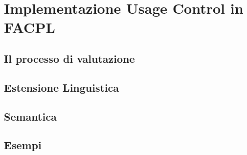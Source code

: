\chapter{Implementazione Usage Control in FACPL}
\label{chap:Implementazione Usage Control in FACPL}
\section{Il processo di valutazione}
\label{sec:Il processo di valutazione}
\section{Estensione Linguistica}
\label{sec:Estensione Linguistica}
\section{Semantica}
\label{sec:Semantica}
\section{Esempi}
\label{sec:Esempi}

